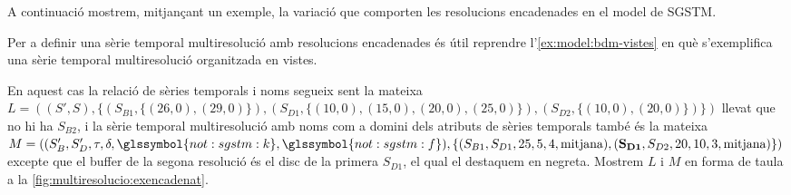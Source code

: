 





A continuació mostrem, mitjançant un exemple, la variació que comporten
les resolucions encadenades en el model de \gls{SGSTM}.


\begin{example} 
  \label{ex:multiresolucio:encadenada}

  Per a definir una sèrie temporal multiresolució amb resolucions
  encadenades és útil reprendre l'\autoref{ex:model:bdm-vistes} en què
  s'exemplifica una sèrie temporal multiresolució organitzada en
  vistes.

  En aquest cas la relació de sèries temporals i noms
   segueix sent la mateixa $L=
  ((S',S),\{
  (S_{B1},\{(26,0),(29,0)\}), (S_{D1},\{(10,0), (15,0), (20,0),
  (25,0)\}), (S_{D2},\{(10,0), (20,0)\} )\})$ llevat que no hi ha
  $S_{B2}$, i la sèrie temporal multiresolució amb noms com a domini
  dels atributs de sèries temporals també és la
  mateixa $M= ((S'_B,S'_D,
  \tau, \delta,
  \glssymbol{not:sgstm:k}, \glssymbol{not:sgstm:f} ),\{ (S_{B1},S_{D1},25 ,5 ,4
  ,\text{mitjana} ), ( \mathbf{S_{D1}},S_{D2},20 , 10 ,3 ,
  \text{mitjana} ) \})$ excepte que el buffer de la segona resolució
  és el disc de la primera $S_{D1}$, el qual el destaquem en negreta.
  Mostrem $L$ i $M$ en forma de
  taula a la \autoref{fig:multiresolucio:exencadenat}.


\end{example}
